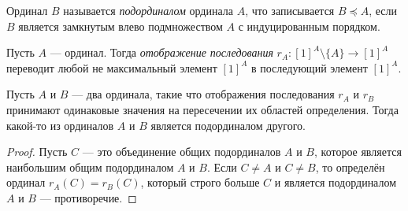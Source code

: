 \documentclass[
	extrafontsizes,
	11pt,
	hyphens,
]{memoir}
\begin{document}
\begin{definition}
Ординал \(B\) называется \emph{подординалом} ординала \(A\), что записывается \(B \preccurlyeq A\), если \(B\) является замкнутым влево подмножеством \(A\) с индуцированным порядком.
\end{definition}



\begin{definition}
Пусть \(A\) --- ординал. Тогда \emph{отображение последования} \(r_A : [1]^A \setminus \{A\} \to [1]^A\) переводит любой не максимальный элемент \([1]^A\) в последующий элемент \([1]^A\).
\end{definition}

\begin{lemma}
Пусть \(A\) и \(B\) --- два ординала, такие что отображения последования \(r_A\) и \(r_B\) принимают одинаковые значения на пересечении их областей определения. Тогда какой-то из ординалов \(A\) и \(B\) является подординалом другого.
\end{lemma}


\begin{proof}
Пусть \(C\) --- это объединение общих подординалов \(A\) и \(B\), которое является наибольшим общим подординалом \(A\) и \(B\). Если \(C \neq A\) и \(C \neq B\), то определён ординал \(r_A(C) = r_B(C)\), который строго больше \(C\) и является подординалом \(A\) и \(B\) --- противоречие.
\end{proof}
\end{document}
